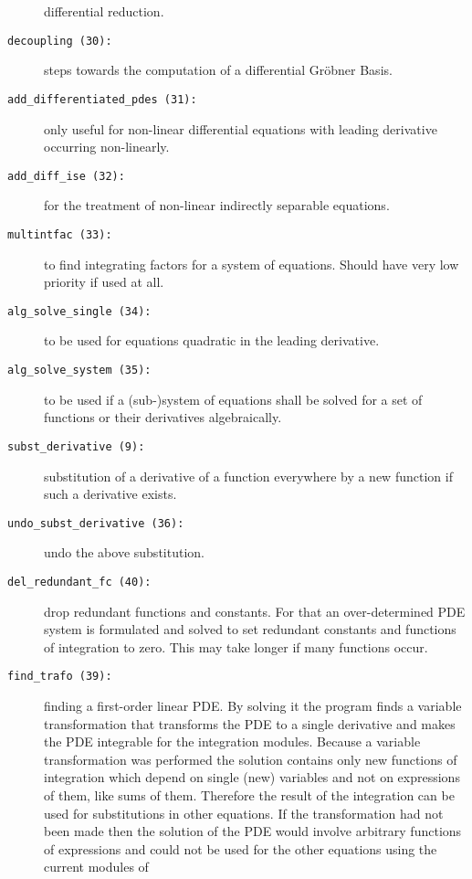 \begin{description}
  differential reduction.
  \label{crack-m_30}
\item[\texttt{decoupling (30):}] steps towards the computation of a
  differential Gr\"{o}bner Basis.
  \label{crack-m_31}
\item[\texttt{add\_differentiated\_pdes (31):}] only useful for
  non-linear differential equations with leading derivative occurring
  non-linearly.
  \label{crack-m_32}
\item[\texttt{add\_diff\_ise (32):}] for the treatment of non-linear
  indirectly separable equations.
  \label{crack-m_33}
\item[\texttt{multintfac (33):}] to find integrating factors for a
  system of equations.  Should have very low priority if used at all.
  \label{crack-m_34}
\item[\texttt{alg\_solve\_single (34):}] to be used for equations
  quadratic in the leading derivative.
  \label{crack-m_35}
\item[\texttt{alg\_solve\_system (35):}] to be used if a (sub-)system
  of equations shall be solved for a set of functions or their
  derivatives algebraically.
  \label{crack-m_9}
\item[\texttt{subst\_derivative (9):}] substitution of a derivative of
  a function everywhere by a new function if such a derivative exists.
  \label{crack-m_36}
\item[\texttt{undo\_subst\_derivative (36):}] undo the above
  substitution.
  \label{crack-m_40}
\item[\texttt{del\_redundant\_fc (40):}] drop redundant functions and
  constants.  For that an over-determined PDE system is formulated and
  solved to set redundant constants and functions of integration to
  zero.  This may take longer if many functions occur.
  \label{crack-m_39}
\item[\texttt{find\_trafo (39):}] finding a first-order linear PDE.
  By solving it the program finds a variable transformation that
  transforms the PDE to a single derivative and makes the PDE
  integrable for the integration modules.  Because a variable
  transformation was performed the solution contains only new
  functions of integration which depend on single (new) variables and
  not on expressions of them, like sums of them.  Therefore the result
  of the integration can be used for substitutions in other equations.
  If the transformation had not been made then the solution of the PDE
  would involve arbitrary functions of expressions and could not be
  used for the other equations using the current modules of

\end{description}
